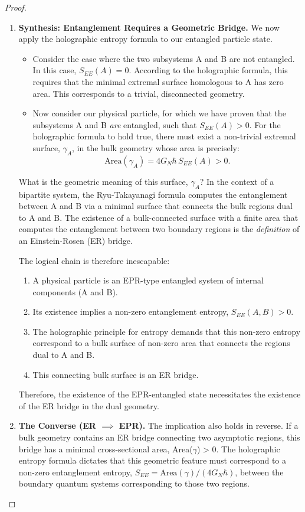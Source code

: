 \documentclass[11pt, letterpaper]{report}
\theoremstyle{plain} %
\theoremstyle{definition} %
\theoremstyle{remark} %
\begin{document}
\begin{proof}
\begin{enumerate}
    \item \textbf{Synthesis: Entanglement Requires a Geometric Bridge.}
    We now apply the holographic entropy formula to our entangled particle state.
    \begin{itemize}
        \item Consider the case where the two subsystems A and B are not entangled. In this case, $S_{EE}(A) = 0$. According to the holographic formula, this requires that the minimal extremal surface homologous to A has zero area. This corresponds to a trivial, disconnected geometry.
        
        \item Now consider our physical particle, for which we have proven that the subsystems A and B \textit{are} entangled, such that $S_{EE}(A) > 0$. For the holographic formula to hold true, there must exist a non-trivial extremal surface, $\gamma_A$, in the bulk geometry whose area is precisely:
        \begin{equation}
            \text{Area}(\gamma_A) = 4 G_N \hbar \, S_{EE}(A) > 0.
        \end{equation}
    \end{itemize}
    What is the geometric meaning of this surface, $\gamma_A$? In the context of a bipartite system, the Ryu-Takayanagi formula computes the entanglement between A and B via a minimal surface that connects the bulk regions dual to A and B. The existence of a bulk-connected surface with a finite area that computes the entanglement between two boundary regions is the \textit{definition} of an Einstein-Rosen (ER) bridge.

    The logical chain is therefore inescapable:
    \begin{enumerate}
        \item A physical particle is an EPR-type entangled system of internal components (A and B).
        \item Its existence implies a non-zero entanglement entropy, $S_{EE}(A,B) > 0$.
        \item The holographic principle for entropy demands that this non-zero entropy correspond to a bulk surface of non-zero area that connects the regions dual to A and B.
        \item This connecting bulk surface is an ER bridge.
    \end{enumerate}
    Therefore, the existence of the EPR-entangled state necessitates the existence of the ER bridge in the dual geometry.

    \item \textbf{The Converse (ER $\implies$ EPR).} The implication also holds in reverse. If a bulk geometry contains an ER bridge connecting two asymptotic regions, this bridge has a minimal cross-sectional area, Area($\gamma$) > 0. The holographic entropy formula dictates that this geometric feature must correspond to a non-zero entanglement entropy, $S_{EE} = \text{Area}(\gamma)/(4G_N\hbar)$, between the boundary quantum systems corresponding to those two regions.
\end{enumerate}
\end{proof}
\end{document}
